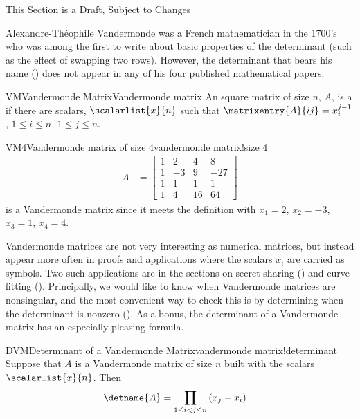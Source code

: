 %
{\sc\large This Section is a Draft, Subject to Changes}\par\bigskip
%
Alexandre-Th\'{e}ophile Vandermonde was a French mathematician in the 1700's who was among the first to write about basic properties of the determinant (such as the effect of swapping two rows).  However, the determinant that bears his name () does not appear in any of his four published mathematical papers. 
%
\begin{definition}{VM}{Vandermonde Matrix}{Vandermonde matrix}
An square matrix of size $n$, $A$, is a  if there are scalars, $\scalarlist{x}{n}$ such that $\matrixentry{A}{ij}=x_{i}^{j-1}$, $1\leq i\leq n$, $1\leq j\leq n$.
\end{definition}
%
%
\begin{example}{VM4}{Vandermonde matrix of size 4}{vandermonde matrix!size 4}
%
\begin{align*}
A&=
\begin{bmatrix}
1 & 2 & 4 & 8\\
1 & -3 & 9 & -27\\
1 & 1 & 1 & 1\\
1 & 4 & 16 & 64
\end{bmatrix}
\end{align*}
%
is a Vandermonde matrix since it meets the definition with $x_1=2$, $x_2=-3$, $x_3=1$, $x_4=4$.
\end{example}
%
Vandermonde matrices are not very interesting as numerical matrices, but instead appear more often in proofs and applications where the scalars $x_i$ are carried as symbols.  Two such applications are in the sections on secret-sharing () and curve-fitting ().  Principally, we would like to know when Vandermonde matrices are nonsingular, and the most convenient way to check this is by determining when the determinant is nonzero ().  As a bonus, the determinant of a Vandermonde matrix has an especially pleasing formula.
%
\begin{theorem}{DVM}{Determinant of a Vandermonde Matrix}{vandermonde matrix!determinant}
Suppose that $A$ is a Vandermonde matrix of size $n$ built with the scalars $\scalarlist{x}{n}$.  Then
%
\begin{align*}
\detname{A}
&=\prod_{1\leq i<j\leq n}\left(x_j-x_i\right)
\end{align*}
%
\end{theorem}
